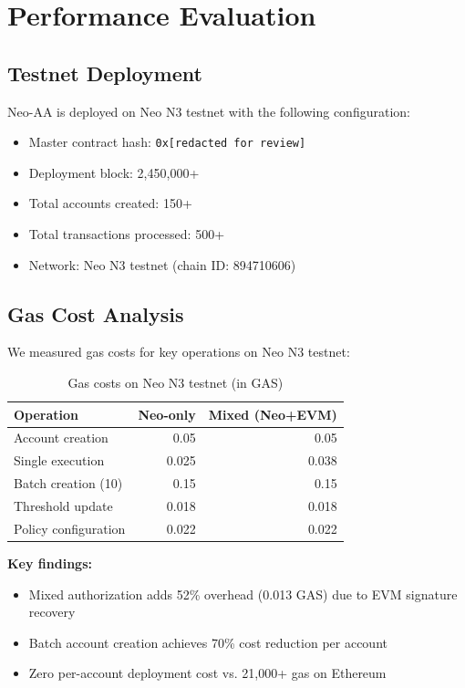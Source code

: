 \documentclass[10pt,twocolumn]{article}
\newcommand{\code}[1]{\texttt{\small #1}}
\begin{document}
\section{Performance Evaluation}

\subsection{Testnet Deployment}

Neo-AA is deployed on Neo N3 testnet with the following configuration:

\begin{itemize}[leftmargin=*,topsep=2pt,itemsep=1pt]
\item Master contract hash: \code{0x[redacted for review]}
\item Deployment block: 2,450,000+
\item Total accounts created: 150+
\item Total transactions processed: 500+
\item Network: Neo N3 testnet (chain ID: 894710606)
\end{itemize}

\subsection{Gas Cost Analysis}

We measured gas costs for key operations on Neo N3 testnet:

\begin{table}[h]
\centering
\caption{Gas costs on Neo N3 testnet (in GAS)}
\begin{tabular}{@{}lrr@{}}
\toprule
Operation & Neo-only & Mixed (Neo+EVM) \\
\midrule
Account creation & 0.05 & 0.05 \\
Single execution & 0.025 & 0.038 \\
Batch creation (10) & 0.15 & 0.15 \\
Threshold update & 0.018 & 0.018 \\
Policy configuration & 0.022 & 0.022 \\
\bottomrule
\end{tabular}
\end{table}

\textbf{Key findings:}
\begin{itemize}[leftmargin=*,topsep=2pt,itemsep=1pt]
\item Mixed authorization adds 52\% overhead (0.013 GAS) due to EVM signature recovery
\item Batch account creation achieves 70\% cost reduction per account
\item Zero per-account deployment cost vs. 21,000+ gas on Ethereum
\end{itemize}
\end{document}
